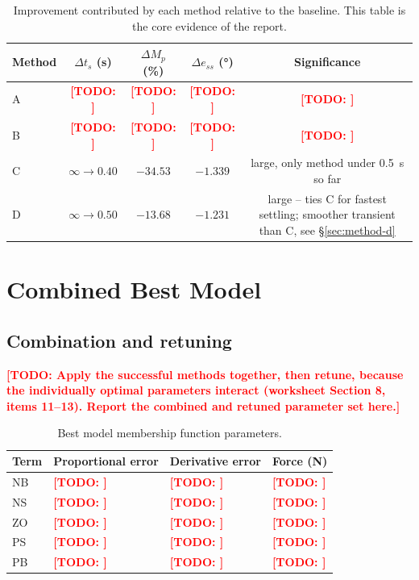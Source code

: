 \documentclass[11pt,a4paper]{article}
\newcommand{\todo}[1]{\textcolor{red}{\textbf{[TODO: #1]}}}
\newcommand{\ts}{\ensuremath{t_s}}
\newcommand{\overshoot}{\ensuremath{M_p}}
\newcommand{\sse}{\ensuremath{e_{ss}}}
\begin{document}
\begin{table}[H]
\centering
\small
\begin{tabular}{@{}lcccc@{}}
\toprule
\textbf{Method} & $\Delta\ts$ (\si{\s}) & $\Delta\overshoot$ (\si{\%}) & $\Delta\sse$ (\si{\degree}) & \textbf{Significance} \\
\midrule
A & \todo{} & \todo{} & \todo{} & \todo{} \\
B & \todo{} & \todo{} & \todo{} & \todo{} \\
C & $\infty\to0.40$ & $-34.53$ & $-1.339$ & large, only method under \SI{0.5}{\s} so far \\
D & $\infty\to0.50$ & $-13.68$ & $-1.231$ &
\parbox[t]{4.2cm}{large -- ties C for fastest settling; smoother
transient than C, see \S\ref{sec:method-d}} \\[0.6em]
\bottomrule
\end{tabular}
\caption{Improvement contributed by each method relative to the baseline. This
table is the core evidence of the report.}
\label{tab:comparison}
\end{table}

\section{Combined Best Model}
\label{sec:best}

\subsection{Combination and retuning}
\label{sec:combination}

\todo{Apply the successful methods together, then retune, because the
individually optimal parameters interact (worksheet Section 8, items 11--13).
Report the combined and retuned parameter set here.}

\begin{table}[H]
\centering
\small
\begin{tabular}{@{}llll@{}}
\toprule
\textbf{Term} & \textbf{Proportional error} & \textbf{Derivative error} & \textbf{Force (\si{\N})} \\
\midrule
NB & \todo{} & \todo{} & \todo{} \\
NS & \todo{} & \todo{} & \todo{} \\
ZO & \todo{} & \todo{} & \todo{} \\
PS & \todo{} & \todo{} & \todo{} \\
PB & \todo{} & \todo{} & \todo{} \\
\bottomrule
\end{tabular}
\caption{Best model membership function parameters.}
\label{tab:best-params}
\end{table}
\end{document}
